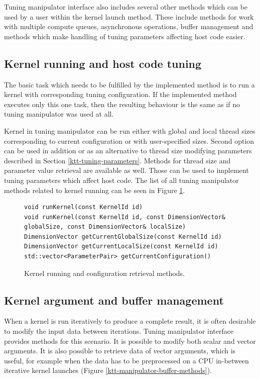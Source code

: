 \documentclass
[
    digital, %
    oneside, %
    table, %
    nolof, %
    nolot, %
    nocover %
]{fithesis3}
\begin{document}
Tuning manipulator interface also includes several other methods which can be used by a user within the kernel launch method. These include methods
for work with multiple compute queues, asynchronous operations, buffer management and methods which make handling of tuning parameters affecting
host code easier.

\subsection{Kernel running and host code tuning}
The basic task which needs to be fulfilled by the implemented method is to run a kernel with corresponding tuning configuration. If the implemented
method executes only this one task, then the resulting behaviour is the same as if no tuning manipulator was used at all.

Kernel in tuning manipulator can be run either with global and local thread sizes corresponding to current configuration or with user-specified sizes.
Second option can be used in addition or as an alternative to thread size modifying parameters described in Section \ref{ktt-tuning-parameters}.
Methods for thread size and parameter value retrieval are available as well. Those can be used to implement tuning parameters which affect host code.
The list of all tuning manipulator methods related to kernel running can be seen in Figure \ref{ktt-manipulator-kernel-methods}.

\begin{figure}
\begin{adjustwidth}{-1cm}{-1cm}
\begin{lstlisting}
void runKernel(const KernelId id)
void runKernel(const KernelId id, const DimensionVector& globalSize, const DimensionVector& localSize)
DimensionVector getCurrentGlobalSize(const KernelId id)
DimensionVector getCurrentLocalSize(const KernelId id)
std::vector<ParameterPair> getCurrentConfiguration()
\end{lstlisting}
\caption{Kernel running and configuration retrieval methods.}
\label{ktt-manipulator-kernel-methods}
\end{adjustwidth}
\end{figure}

\subsection{Kernel argument and buffer management}
When a kernel is run iteratively to produce a complete result, it is often desirable to modify the input data between iterations. Tuning manipulator
interface provides methods for this scenario. It is possible to modify both scalar and vector arguments. It is also possible to retrieve data of
vector arguments, which is useful, for example when the data has to be preprocessed on a CPU in-between iterative kernel launches (Figure
\ref{ktt-manipulator-buffer-methods}).
\end{document}
